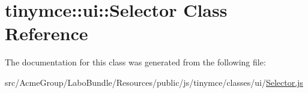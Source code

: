 \hypertarget{classtinymce_1_1ui_1_1_selector}{\section{tinymce\+:\+:ui\+:\+:Selector Class Reference}
\label{classtinymce_1_1ui_1_1_selector}
}


The documentation for this class was generated from the following file\+:\begin{DoxyCompactItemize}
\item 
src/\+Acme\+Group/\+Labo\+Bundle/\+Resources/public/js/tinymce/classes/ui/\hyperlink{_selector_8js}{Selector.\+js}\end{DoxyCompactItemize}
